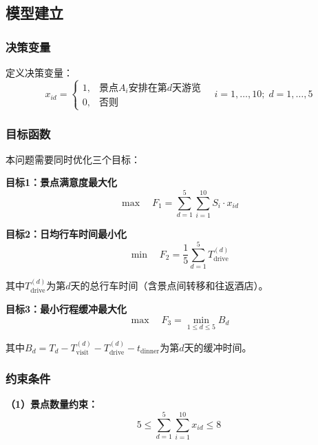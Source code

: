 \documentclass[12pt,a4paper]{ctexart}
\begin{document}
\subsection{模型建立}

\subsubsection{决策变量}

定义决策变量：
\begin{equation}
x_{id} = \begin{cases} 1, & \text{景点}A_i\text{安排在第}d\text{天游览} \\ 0, & \text{否则} \end{cases}
\quad i=1,\ldots,10; \; d=1,\ldots,5
\end{equation}

\subsubsection{目标函数}

本问题需要同时优化三个目标：

\textbf{目标1：景点满意度最大化}
\begin{equation}
\label{obj:satisfaction}
\max \quad F_1 = \sum_{d=1}^{5} \sum_{i=1}^{10} S_i \cdot x_{id}
\end{equation}

\textbf{目标2：日均行车时间最小化}
\begin{equation}
\label{obj:driving}
\min \quad F_2 = \frac{1}{5} \sum_{d=1}^{5} T_{\text{drive}}^{(d)}
\end{equation}

其中$T_{\text{drive}}^{(d)}$为第$d$天的总行车时间（含景点间转移和往返酒店）。

\textbf{目标3：最小行程缓冲最大化}
\begin{equation}
\label{obj:buffer}
\max \quad F_3 = \min_{1 \le d \le 5} B_d
\end{equation}

其中$B_d = T_d - T_{\text{visit}}^{(d)} - T_{\text{drive}}^{(d)} - t_{\text{dinner}}$为第$d$天的缓冲时间。

\subsubsection{约束条件}

\textbf{（1）景点数量约束：}
\begin{equation}
\label{con:num}
5 \le \sum_{d=1}^{5}\sum_{i=1}^{10} x_{id} \le 8
\end{equation}
\end{document}
